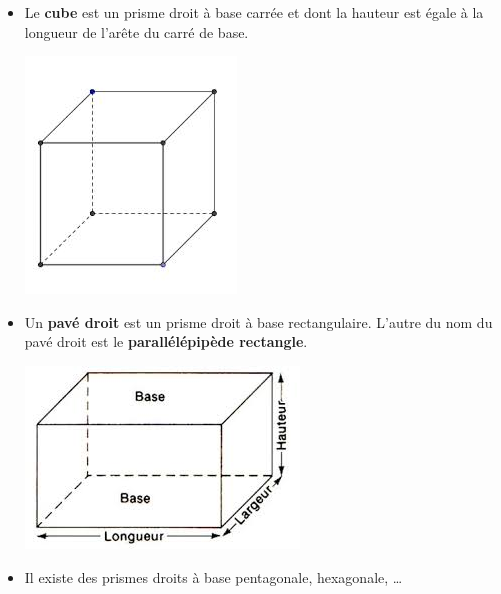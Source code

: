    
\begin{itemize}
\item Le \textbf{cube} est un prisme droit à base carrée et dont la hauteur est égale à la longueur de l'arête du carré de base.

\includegraphics[scale=0.3]{RepS-cube.jpg} 

\item Un \textbf{pavé droit} est un prisme droit à base rectangulaire. L'autre du nom du pavé droit est le \textbf{parallélépipède rectangle}.

\includegraphics[scale=0.3]{RepS-pave.jpg} 

\item Il existe des prismes droits à base pentagonale, hexagonale, \ldots{}


\end{itemize}
